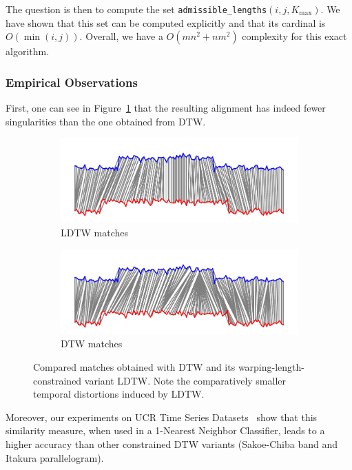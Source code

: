The question is then to compute the set
\texttt{admissible\_lengths}$(i, j, K_\text{max})$.
We have shown that this set can be computed explicitly and that its cardinal
is $O(\min(i, j))$.
Overall, we have a $O(mn^2 + nm^2)$ complexity for this exact algorithm.

\subsubsection{Empirical Observations}

First, one can see in Figure~\ref{fig:ldtw} that the resulting alignment
has indeed fewer singularities than the one obtained from DTW.

\begin{figure}[t]
    \begin{subfigure}[b]{\textwidth}
         \centering
         \includegraphics[width=.8\textwidth]{fig/dtw_warping_length}
         \caption{LDTW matches}
     \end{subfigure}
     \begin{subfigure}[b]{\textwidth}
          \centering
          \includegraphics[width=.8\textwidth]{fig/dtw_warping_length_b}
          \caption{DTW matches}
      \end{subfigure}
    \caption{Compared matches obtained with DTW and its
    warping-length-constrained variant LDTW. Note the comparatively smaller
    temporal distortions induced by LDTW.}
    \label{fig:ldtw}
\end{figure}

Moreover, our experiments on UCR Time Series Datasets~\cite{ucr} show that
this similarity measure, when used in a 1-Nearest Neighbor Classifier, leads to
a higher accuracy than other constrained DTW variants
(Sakoe-Chiba band and Itakura parallelogram).
